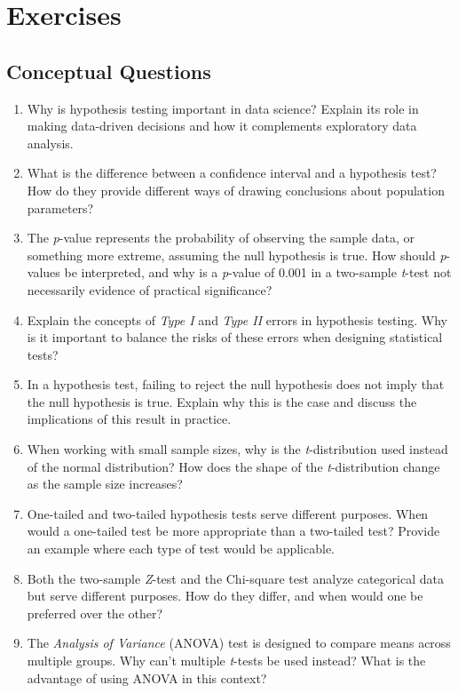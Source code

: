 \documentclass[
]{book}
\theoremstyle{definition}
\theoremstyle{definition}
\theoremstyle{definition}
\theoremstyle{definition}
\theoremstyle{remark}
\begin{document}
\section{Exercises}\label{exercises-3}

\subsection*{Conceptual Questions}\label{conceptual-questions-1}

\begin{enumerate}
\def\labelenumi{\arabic{enumi}.}
\item
  Why is hypothesis testing important in data science? Explain its role in making data-driven decisions and how it complements exploratory data analysis.
\item
  What is the difference between a confidence interval and a hypothesis test? How do they provide different ways of drawing conclusions about population parameters?
\item
  The \emph{p}-value represents the probability of observing the sample data, or something more extreme, assuming the null hypothesis is true. How should \emph{p}-values be interpreted, and why is a \emph{p}-value of 0.001 in a two-sample \emph{t}-test not necessarily evidence of practical significance?
\item
  Explain the concepts of \emph{Type I} and \emph{Type II} errors in hypothesis testing. Why is it important to balance the risks of these errors when designing statistical tests?
\item
  In a hypothesis test, failing to reject the null hypothesis does not imply that the null hypothesis is true. Explain why this is the case and discuss the implications of this result in practice.
\item
  When working with small sample sizes, why is the \emph{t}-distribution used instead of the normal distribution? How does the shape of the \emph{t}-distribution change as the sample size increases?
\item
  One-tailed and two-tailed hypothesis tests serve different purposes. When would a one-tailed test be more appropriate than a two-tailed test? Provide an example where each type of test would be applicable.
\item
  Both the two-sample \emph{Z}-test and the Chi-square test analyze categorical data but serve different purposes. How do they differ, and when would one be preferred over the other?
\item
  The \emph{Analysis of Variance} (ANOVA) test is designed to compare means across multiple groups. Why can't multiple \emph{t}-tests be used instead? What is the advantage of using ANOVA in this context?
\end{enumerate}
\end{document}
